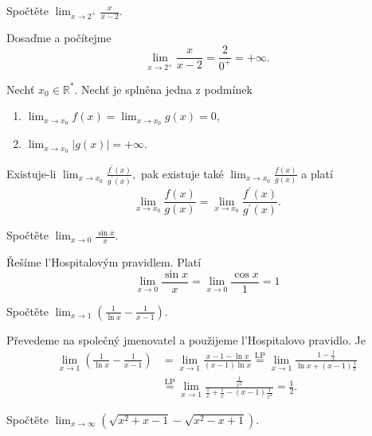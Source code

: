 \begin{priklad}
Spočtěte $\lim_{x\to 2^+}\frac{x}{x-2}.$
\end{priklad}

\begin{reseni}
Dosaďme a počítejme
 $$\lim_{x\to 2^+}\frac{x}{x-2}=\frac{2}{0^+}=+\infty.$$
\end{reseni}

\begin{veta}
Nechť $x_0\in \mathbb R^*$. Nechť je splněna jedna z podmínek
\begin{enumerate}[$i.$]
\item $\lim_{x\to x_0}f(x)=\lim_{x\to x_0}g(x)=0,$
\item $\lim_{x\to x_0}|g(x)| = +\infty.$
\end{enumerate}
Existuje-li $\lim_{x\to x_0}\frac{f^\prime (x)}{g^\prime (x)},$ pak existuje také
$\lim_{x\to x_0}\frac{f(x)}{g(x)}$ a platí
$$\lim_{x\to x_0}\frac{f(x)}{g(x)}=\lim_{x\to x_0}\frac{f^\prime (x)}{g^\prime(x)}.$$
\end{veta}

\begin{priklad}
  Spočtěte $\lim_{x\to 0}\frac{\sin x}{x}.$
\end{priklad}

\begin{reseni}
  Řešíme l'Hospitalovým pravidlem.
  Platí
  $$\lim_{x\to 0}\frac{\sin x}{x}=\lim_{x\to 0}\frac{\cos x}{1}=1$$
\end{reseni}


\begin{priklad}
Spočtěte $\lim_{x\to 1} \left ( \frac{1}{\ln x}-\frac{1}{x-1} \right ) $.
\end{priklad}

\begin{reseni}
Převedeme na společný jmenovatel a použijeme l'Hospitalovo pravidlo. Je
\begin{align*}
\lim_{x\to 1} \left ( \frac{1}{\ln x}-\frac{1}{x-1} \right ) &= \lim_{x \to 1} \frac{x-1-\ln x}{(x-1)\ln x} \stackrel{\text{LP}}{=} \lim_{x \to 1} \frac{1 - \frac{1}{x}}{\ln x + (x-1) \frac{1}{x}}\\
& \stackrel{\text{LP}}{=}\lim_{x \to 1} \frac{\frac{1}{x^2}}{\frac{1}{x} + \frac{1}{x} - (x-1) \frac{1}{x^2}} = \frac{1}{2}.
\end{align*}
\end{reseni}

\begin{priklad}
Spočtěte $\lim_{x\to \infty}\left ( \sqrt{x^2+x-1}-\sqrt{x^2-x+1}   \right ) $.
\end{priklad}

